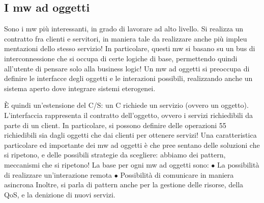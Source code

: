 \subsection{I mw ad oggetti}
Sono i mw più interessanti, in grado di lavorare ad alto livello. Si realizza un
contratto fra clienti e servitori, in maniera tale da realizzare anche più impleu
mentazioni dello stesso servizio! In particolare, questi mw si basano su un bus
di interconnessione che si occupa di certe logiche di base, permettendo quindi
all'utente di pensare solo alla business logic! Un mw ad oggetti si preoccupa di
definire le interfacce degli oggetti e le interazioni possibili, realizzando anche un
sistema aperto dove integrare sistemi eterogenei.

È quindi un'estensione del C/S: un C richiede un servizio (ovvero un oggetto). L'interfaccia rappresenta il contratto
dell'oggetto, ovvero i servizi richiedibili da parte di un client. In particolare, si possono definire delle operazioni
55
richiedibili sia dagli oggetti che dai clienti per ottenere servizi!
Una caratteristica particolare ed importante dei mw ad oggetti è che pree
sentano delle soluzioni che si ripetono, e delle possibili strategie da scegliere:
abbiamo dei pattern, meccanismi che si ripetono!
La base per ogni mw ad oggetti sono:
$\bullet$ La possibilità di realizzare un'interazione remota
$\bullet$ Possibilità di comunicare in maniera asincrona
Inoltre, si parla di pattern anche per la gestione delle risorse, della QoS, e la
denizione di nuovi servizi.
